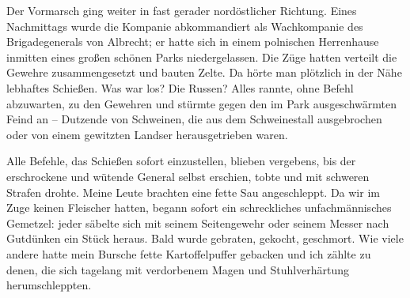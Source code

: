 Der Vormarsch ging weiter in fast gerader nordöstlicher Richtung. Eines Nachmittags wurde die Kompanie abkommandiert als Wachkompanie des Brigadegenerals von Albrecht; er hatte sich in einem polnischen Herrenhause inmitten eines großen schönen Parks niedergelassen. Die Züge hatten verteilt die Gewehre zusammengesetzt und bauten Zelte. Da hörte man plötzlich in der Nähe lebhaftes Schießen. Was war los? Die Russen? Alles rannte, ohne Befehl abzuwarten, zu den Gewehren und stürmte gegen den im Park ausgeschwärmten Feind an -- Dutzende von Schweinen, die aus dem Schweinestall ausgebrochen oder von einem gewitzten Landser herausgetrieben waren.

Alle Befehle, das Schießen sofort einzustellen, blieben vergebens, bis der erschrockene und wütende General selbst erschien, tobte und mit schweren Strafen drohte. Meine Leute brachten eine fette Sau angeschleppt. Da wir im Zuge keinen Fleischer hatten, begann sofort ein schreckliches unfachmännisches Gemetzel: jeder säbelte sich mit seinem Seitengewehr oder seinem Messer nach Gutdünken ein Stück heraus. Bald wurde gebraten, gekocht, geschmort. Wie viele andere hatte mein Bursche fette Kartoffelpuffer gebacken und ich zählte zu denen, die sich tagelang mit verdorbenem Magen und Stuhlverhärtung herumschleppten.

